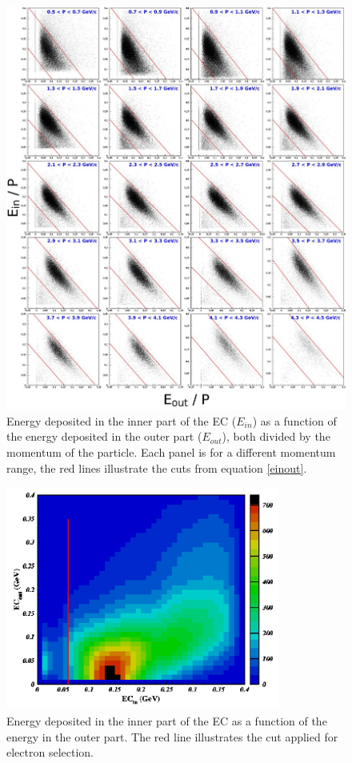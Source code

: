 \begin{figure}[p]
\centering
\includegraphics[width=14cm] {chap5-fig/fig02.jpg} 
\caption {Energy deposited in the inner part of the EC ($E_{in}$) as a function of the 
energy deposited in the outer part ($E_{out}$), both divided by the momentum of the 
particle. Each panel is for a different momentum range, the red lines 
illustrate the cuts from equation \ref{einout}.}
\label{eleEC}
\end{figure}

\begin{figure}[tbp]
\centering
\includegraphics[width=9cm] {chap5-fig/fig03.png} 
\caption {Energy deposited in the inner part of the EC as a function of the 
energy in the outer part. The red line illustrates the cut applied for 
electron selection.}
\label{eleECi}
\end{figure}

